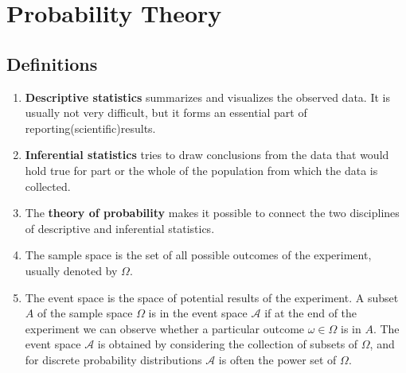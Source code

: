 \chapter{Probability Theory}

\section{Definitions}

\begin{enumerate}
    \item \textbf{Descriptive statistics} summarizes and visualizes the observed data. It is usually not very difficult, but it forms an essential part of reporting(scientific)results.
    \hfill \cite{statistics/book/Statistics-for-Data-Scientists/Maurits-Kaptein}

    \item \textbf{Inferential statistics} tries to draw conclusions from the data that would hold true for part or the whole of the population from which the data is collected.
    \hfill \cite{statistics/book/Statistics-for-Data-Scientists/Maurits-Kaptein}

    \item The \textbf{theory of probability} makes it possible to connect the two disciplines of descriptive and inferential statistics.
    \hfill \cite{statistics/book/Statistics-for-Data-Scientists/Maurits-Kaptein}

    \item
    \begin{definition}
        The sample space is the set of all possible outcomes of the experiment, usually denoted by $\Omega$.
        \hfill \cite{mfml/book/mml/Deisenroth-Faisal-Ong}
    \end{definition}

    \item
    \begin{definition}
        The event space is the space of potential results of the experiment. 
        A subset $A$ of the sample space $\Omega$ is in the event space $\mathcal{A}$ if at the end of the experiment we can observe whether a particular outcome $\omega \in \Omega$ is in $A$. 
        The event space $\mathcal{A}$ is obtained by considering the collection of subsets of $\Omega$, and for discrete probability distributions $\mathcal{A}$ is often the power set of $\Omega$.
        \hfill \cite{mfml/book/mml/Deisenroth-Faisal-Ong}
    \end{definition}


\end{enumerate}
